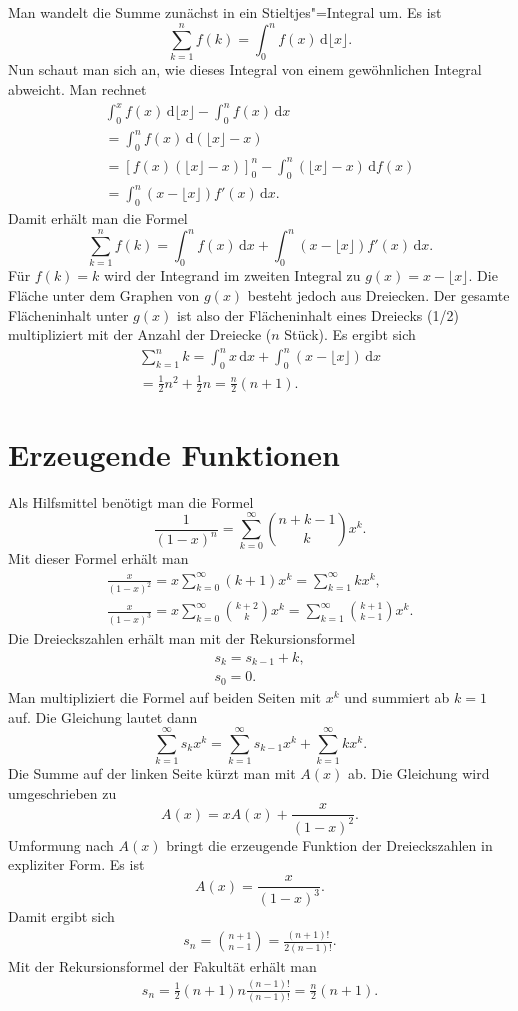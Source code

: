 \documentclass[a4paper,10pt,fleqn,twocolumn,twoside]{article}
\begin{document}
Man wandelt die Summe zunächst in ein Stieltjes"=Integral um. Es ist
\[\sum_{k=1}^n f(k) = \int_0^n f(x)\,\mathrm d\lfloor x\rfloor.\]
Nun schaut man sich an, wie dieses Integral von einem gewöhnlichen
Integral abweicht. Man rechnet
\begin{gather*}
\int_0^x f(x)\,\mathrm d\lfloor x\rfloor - \int_0^n f(x)\,\mathrm dx\\
= \int_0^n f(x)\,\mathrm d(\lfloor x\rfloor-x)\\
= [f(x)(\lfloor x\rfloor-x)]_0^n
- \int_0^n (\lfloor x\rfloor -x)\,\mathrm df(x)\\
= \int_0^n (x-\lfloor x\rfloor)f'(x)\,\mathrm dx.
\end{gather*}
Damit erhält man die Formel
\[\sum_{k=1}^n f(k) = \int_0^n f(x)\,\mathrm dx
+\int_0^n (x-\lfloor x\rfloor)f'(x)\,\mathrm dx.\]
Für $f(k)=k$ wird der Integrand im zweiten Integral zu
$g(x)=x-\lfloor x\rfloor$. Die Fläche unter dem Graphen von $g(x)$
besteht jedoch aus Dreiecken. Der gesamte Flächeninhalt unter $g(x)$
ist also der Flächeninhalt eines Dreiecks (1/2) multipliziert
mit der Anzahl der Dreiecke ($n$ Stück). Es ergibt sich
\begin{gather*}
\sum_{k=1}^n k = \int_0^n x\,\mathrm dx
+\int_0^n (x-\lfloor x\rfloor)\,\mathrm dx\\
= \frac{1}{2}n^2 + \frac{1}{2}n = \frac{n}{2}(n+1).
\end{gather*}

\section{Erzeugende Funktionen}

Als Hilfsmittel benötigt man die Formel
\[\frac{1}{(1-x)^n} = \sum_{k=0}^{\infty} \binom{n+k-1}{k} x^k.\]
Mit dieser Formel erhält man
\begin{gather*}
\frac{x}{(1-x)^2} = x\sum_{k=0}^{\infty} (k+1)x^k
= \sum_{k=1}^{\infty} kx^k,\\
\frac{x}{(1-x)^3} = x\sum_{k=0}^{\infty} \binom{k+2}{k} x^k
= \sum_{k=1}^{\infty} \binom{k+1}{k-1}x^k.
\end{gather*}
Die Dreieckszahlen erhält man mit der Rekursionsformel
\begin{gather*}
s_k=s_{k-1}+k,\\
s_0=0.
\end{gather*}
Man multipliziert die Formel auf beiden Seiten mit $x^k$
und summiert ab $k=1$ auf. Die Gleichung lautet dann
\[\sum_{k=1}^{\infty} s_k x^k
= \sum_{k=1}^{\infty} s_{k-1}x^k + \sum_{k=1}^{\infty} kx^k.\]
Die Summe auf der linken Seite kürzt man mit $A(x)$ ab.
Die Gleichung wird umgeschrieben zu
\[A(x) = xA(x) + \frac{x}{(1-x)^2}.\]
Umformung nach $A(x)$ bringt die erzeugende Funktion der
Dreieckszahlen in expliziter Form. Es ist
\[A(x) = \frac{x}{(1-x)^3}.\]
Damit ergibt sich
\begin{gather*}
s_n = \binom{n+1}{n-1} = \frac{(n+1)!}{2(n-1)!}.
\end{gather*}
Mit der Rekursionsformel der Fakultät erhält man
\begin{gather*}
s_n = \frac{1}{2}(n+1)n\frac{(n-1)!}{(n-1)!}
= \frac{n}{2}(n+1).
\end{gather*}
\end{document}
